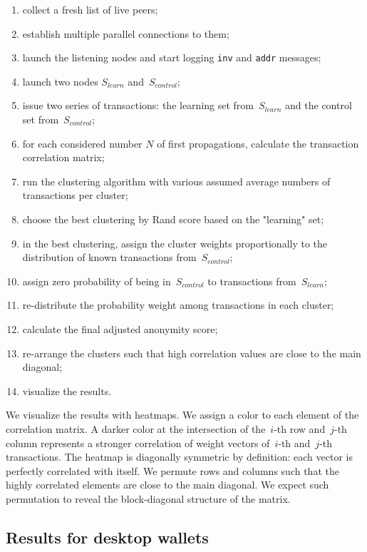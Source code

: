 \begin{enumerate}
	\item collect a fresh list of live peers;
	\item establish multiple parallel connections to them;
	\item launch the listening nodes and start logging \texttt{inv} and \texttt{addr} messages;
	\item launch two nodes $S_{learn}$ and~$S_{control}$;%
	\item issue two series of transactions: the learning set from~$S_{learn}$ and the control set from~$S_{control}$;
	\item for each considered number $N$ of first propagations, calculate the transaction correlation matrix;
	\item run the clustering algorithm with various assumed average numbers of transactions per cluster;
	\item choose the best clustering by Rand score based on the "learning" set;
	\item in the best clustering, assign the cluster weights proportionally to the distribution of known transactions from~$S_{control}$;
	\item assign zero probability of being in~$S_{control}$ to transactions from~$S_{learn}$;
	\item re-distribute the probability weight among transactions in each cluster;
	\item calculate the final adjusted anonymity score;
	\item re-arrange the clusters such that high correlation values are close to the main diagonal;
	\item visualize the results.
\end{enumerate}

We visualize the results with heatmaps.
We assign a color to each element of the correlation matrix.
A darker color at the intersection of the~\mbox{$i$-th} row and~\mbox{$j$-th} column represents a stronger correlation of weight vectors of~\mbox{$i$-th} and~\mbox{$j$-th} transactions.
The heatmap is diagonally symmetric by definition: each vector is perfectly correlated with itself.
We permute rows and columns such that the highly correlated elements are close to the main diagonal.
We expect such permutation to reveal the block-diagonal structure of the matrix.


\subsection{Results for desktop wallets}

